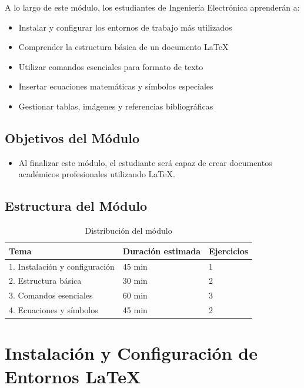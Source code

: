 \documentclass[11pt,letterpaper]{article}
\begin{document}
	A lo largo de este módulo, los estudiantes de Ingeniería Electrónica aprenderán a:
	\begin{itemize}
		\item Instalar y configurar los entornos de trabajo más utilizados
		\item Comprender la estructura básica de un documento \LaTeX
		\item Utilizar comandos esenciales para formato de texto
		\item Insertar ecuaciones matemáticas y símbolos especiales
		\item Gestionar tablas, imágenes y referencias bibliográficas
	\end{itemize}
	
	\subsection*{Objetivos del Módulo}
	\begin{itemize}
		\item Al finalizar este módulo, el estudiante será capaz de crear documentos académicos profesionales utilizando \LaTeX.
	\end{itemize}
	
	\subsection*{Estructura del Módulo}
	
	\begin{table}[H]
		\centering
		\begin{tabular}{@{}lll@{}}
			\toprule
			\textbf{Tema} & \textbf{Duración estimada} & \textbf{Ejercicios} \\
			\midrule
			1. Instalación y configuración & 45 min & 1 \\
			2. Estructura básica & 30 min & 2 \\
			3. Comandos esenciales & 60 min & 3 \\
			4. Ecuaciones y símbolos & 45 min & 2 \\
			\bottomrule
		\end{tabular}
		\caption{Distribución del módulo}
		\label{tab:distribucion}
	\end{table}
	
	\newpage
	
	
	\section{Instalación y Configuración de Entornos \LaTeX}
	
\end{document}
